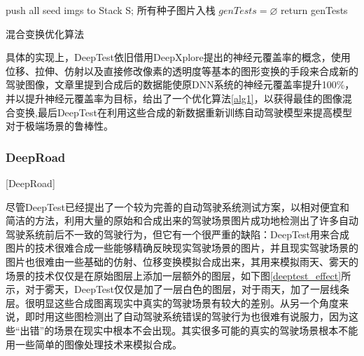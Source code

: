 \begin{algorithm}[h]
    \small
    \SetAlgoLined


    push all seed imgs to Stack S; 所有种子图片入栈\;
    $genTests = \varnothing$\;
    return genTests
    \caption{混合变换优化算法\cite{DeepTest}}
    \label{alg1}
\end{algorithm}

具体的实现上，DeepTest依旧借用DeepXplore提出的神经元覆盖率的概念，使用位移、拉伸、仿射以及直接修改像素的透明度等基本的图形变换的手段来合成新的驾驶图像，文章里提到合成后的数据能使原DNN系统的神经元覆盖率提升100\%\cite{DeepTest}，并以提升神经元覆盖率为目标，给出了一个优化算法\ref{alg1}，以获得最佳的图像混合变换,最后DeepTest在利用这些合成的新数据重新训练自动驾驶模型来提高模型对于极端场景的鲁棒性。

\subsubsection{DeepRoad}[DeepRoad]

尽管DeepTest已经提出了一个较为完善的自动驾驶系统测试方案，以相对便宜和简洁的方法，利用大量的原始和合成出来的驾驶场景图片成功地检测出了许多自动驾驶系统前后不一致的驾驶行为，但它有一个很严重的缺陷：DeepTest用来合成图片的技术很难合成一些能够精确反映现实驾驶场景的图片，并且现实驾驶场景的图片也很难由一些基础的仿射、位移变换模拟合成出来，其用来模拟雨天、雾天的场景的技术仅仅是在原始图层上添加一层额外的图层，如下图\ref{deeptest_effect}所示，对于雾天，DeepTest仅仅是加了一层白色的图层，对于雨天，加了一层线条层。很明显这些合成图离现实中真实的驾驶场景有较大的差别。从另一个角度来说，即时用这些图检测出了自动驾驶系统错误的驾驶行为也很难有说服力，因为这些“出错”的场景在现实中根本不会出现。其实很多可能的真实的驾驶场景根本不能用一些简单的图像处理技术来模拟合成。

